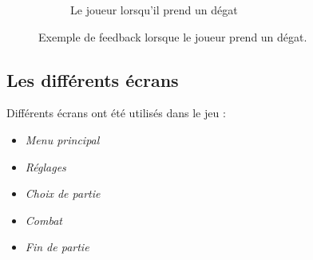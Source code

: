 \begin{figure}[h]
\begin{subfigure}[t]{0.45\textwidth}
            \caption{Le joueur lorsqu'il prend un dégat}
        \end{subfigure}
        \caption{Exemple de feedback lorsque le joueur prend un dégat.}
        \label{fig:feedback}
    \end{figure}


\subsection{Les différents écrans}

Différents écrans ont été utilisés dans le jeu :
\begin{itemize}
    \item \textit{Menu principal}
    \item \textit{Réglages}
    \item \textit{Choix de partie}
    \item \textit{Combat}
    \item \textit{Fin de partie}
\end{itemize}
